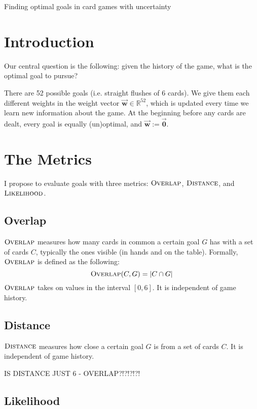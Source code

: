 \documentclass[11pt]{article}
\newcommand{\bvec}[1]{\vec{\mathbf{#1}}}
\newcommand{\R}{\mathbb{R}}
\newcommand{\dist}{\textsc{Distance}}
\newcommand{\overlap}{\textsc{Overlap}}
\newcommand{\lkhd}{\textsc{Likelihood}}
\begin{document}
\begin{center}
\Large{Finding optimal goals in card games with uncertainty}
\end{center}

\section{Introduction}

Our central question is the following: given the history of the game, what is the optimal goal to pursue?

There are 52 possible goals (i.e. straight flushes of 6 cards). We give them each different weights in the weight vector $\bvec{w} \in \R^{52}$, which is updated every time we learn new information about the game. At the beginning before any cards are dealt, every goal is equally (un)optimal, and $\bvec{w} := \bvec{0}$.

\section{The Metrics}

I propose to evaluate goals with three metrics: $\overlap$, $\dist$, and $\lkhd$.

\subsection{Overlap}

$\overlap$ measures how many cards in common a certain goal $G$ has with a set of cards $C$, typically the ones visible (in hands and on the table). Formally, $\overlap$ is defined as the following:
\begin{equation}
\overlap(C,G) = |C \cap G|
\label{eq:overlap} \end{equation}
$\overlap$ takes on values in the interval $[0,6]$. It is independent of game history.

\subsection{Distance}

$\dist$ measures how close a certain goal $G$ is from a set of cards $C$. It is independent of game history.

IS DISTANCE JUST 6 - OVERLAP?!?!?!?!

\subsection{Likelihood}
\end{document}
